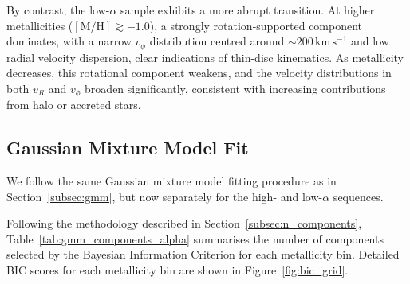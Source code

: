 \documentclass[a4paper,12pt]{article}
\begin{document}
By contrast, the low-$\alpha$ sample exhibits a more abrupt transition. At higher metallicities 
($[\mathrm{M/H}] \gtrsim -1.0$), a strongly rotation-supported component dominates, with a narrow $v_\phi$ 
distribution centred around $\sim200\,\mathrm{km\,s^{-1}}$ and low radial velocity dispersion, clear indications 
of thin-disc kinematics. As metallicity decreases, this rotational component weakens, and the velocity 
distributions in both $v_R$ and $v_\phi$ broaden significantly, consistent with increasing contributions 
from halo or accreted stars.


\subsection{Gaussian Mixture Model Fit}

We follow the same Gaussian mixture model fitting procedure as in
Section~\ref{subsec:gmm}, but now separately for the high- and low-$\alpha$ sequences.

\begin{table}[H]
  \centering
  \caption{Number of Gaussian Mixture components selected by the BIC for each metallicity bin, split by $\alpha$-sequence.}
    \label{tab:gmm_components_alpha}
\end{table}

Following the methodology described in Section~\ref{subsec:n_components}, Table~\ref{tab:gmm_components_alpha} summarises 
the number of components selected by the Bayesian Information Criterion for each metallicity bin.
Detailed BIC scores for each metallicity bin are shown in Figure~\ref{fig:bic_grid}.
\end{document}
